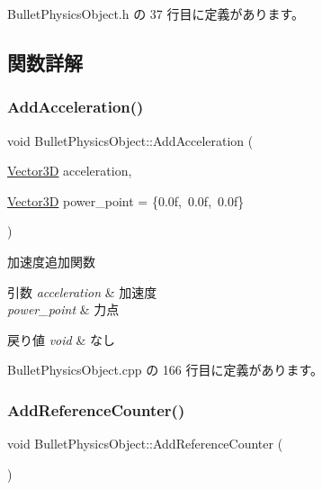  Bullet\+Physics\+Object.\+h の 37 行目に定義があります。



\subsection{関数詳解}
\mbox{\label{class_bullet_physics_object_a1d7e12c68b4959fefd36cddb4f5f59a2}} 
\subsubsection{\texorpdfstring{Add\+Acceleration()}{AddAcceleration()}}
{\footnotesize\ttfamily void Bullet\+Physics\+Object\+::\+Add\+Acceleration (\begin{DoxyParamCaption}\item[{\mbox{\hyperlink{class_vector3_d}{Vector3D}}}]{acceleration,  }\item[{\mbox{\hyperlink{class_vector3_d}{Vector3D}}}]{power\+\_\+point = {\ttfamily \{0.0f,~0.0f,~0.0f\}} }\end{DoxyParamCaption})}



加速度追加関数 


\begin{DoxyParams}{引数}
{\em acceleration} & 加速度 \\
\hline
{\em power\+\_\+point} & 力点 \\
\hline
\end{DoxyParams}

\begin{DoxyRetVals}{戻り値}
{\em void} & なし \\
\hline
\end{DoxyRetVals}


 Bullet\+Physics\+Object.\+cpp の 166 行目に定義があります。

\mbox{\label{class_bullet_physics_object_a2d8bbb2460766e646eabbff414f54cde}} 
\subsubsection{\texorpdfstring{Add\+Reference\+Counter()}{AddReferenceCounter()}}
{\footnotesize\ttfamily void Bullet\+Physics\+Object\+::\+Add\+Reference\+Counter (\begin{DoxyParamCaption}{ }\end{DoxyParamCaption})}



